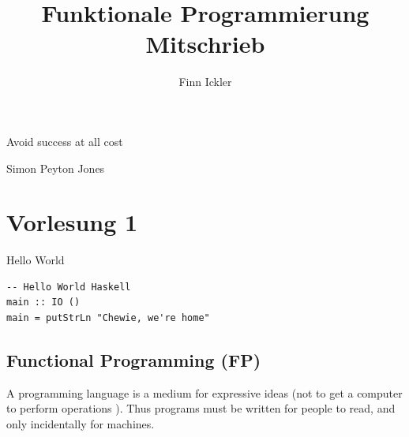 \documentclass{article}
\title{Funktionale Programmierung Mitschrieb}
\author{Finn Ickler}
\begin{document}
\maketitle
\epigraph{\glqq Avoid success at all cost \grqq}{Simon Peyton Jones}
\tableofcontents
\listoflistings
\section{Vorlesung 1}
\begin{listing}
\caption{Hello World}
\begin{verbatim}
-- Hello World Haskell
main :: IO ()
main = putStrLn "Chewie, we're home"
\end{verbatim}
\end{listing}
\subsection{Functional Programming (FP)}
A programming language is a medium for expressive ideas (not to get a computer to perform operations ). Thus programs must be written for people to read, and only incidentally for machines.
\end{document}
